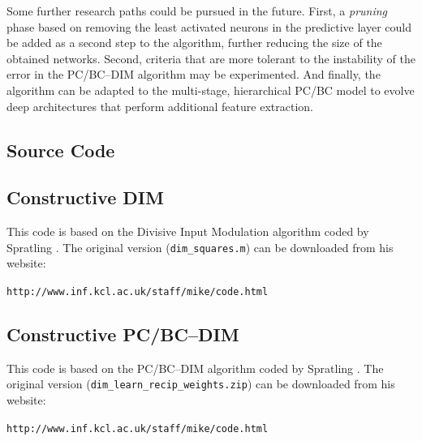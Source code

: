 \documentclass[11pt,a4paper]{report}
\begin{document}
		Some further research paths could be pursued in the future. First, a \emph{pruning} phase based on removing the least activated neurons in the predictive layer could be added as a second step to the algorithm, further reducing the size of the obtained networks. Second, criteria that are more tolerant to the instability of the error in the PC/BC--DIM algorithm may be experimented. And finally, the algorithm can be adapted to the multi-stage, hierarchical PC/BC model to evolve deep architectures that perform additional feature extraction. 
	
	
	
	\nocite{*}
	
	\begin{appendices}
		\chapter{Source Code}
			\section{Constructive DIM}
				This code is based on the Divisive Input Modulation algorithm coded by Spratling \cite{spratling2009unsupervised}. The original version (\texttt{dim\_squares.m}) can be downloaded from his website:
				
				\texttt{http://www.inf.kcl.ac.uk/staff/mike/code.html}
				
				
				
			\section{Constructive PC/BC--DIM}
				This code is based on the PC/BC--DIM algorithm coded by Spratling \cite{spratling2012unsupervised}. The original version (\texttt{dim\_learn\_recip\_weights.zip}) can be downloaded from his website:
				
				\texttt{http://www.inf.kcl.ac.uk/staff/mike/code.html}
				
				
				
				
				
				
				
				
				
				
				
	\end{appendices}
\end{document}
